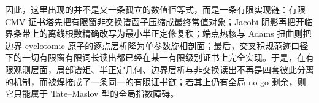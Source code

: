 \noindent
因此，这里出现的并不是又一条孤立的数值恒等式，而是一条有限实现链：有限 CMV 证书塔先把有限窗非交换谱函子压缩成最终常值对象；Jacobi 阴影再把开临界条带上的离线根数精确改写为最小半正定修复秩；端点热核与 Adams 扭曲则把边界 cyclotomic 原子的逐点层析降为单参数旋相剖面；最后，交叉积规范迹口径下的一切有限窗有限词长读出都已经在某一有限级别证书上完全实现。于是，在有限观测层面，局部谱矩、半正定几何、边界层析与非交换读出不再是四套彼此分离的机制，而被焊接成了一条同一的有限证书链；若其上仍有全局 no-go 剩余，则它只能属于 Tate--Maslov 型的全局指数障碍。

\endinput
